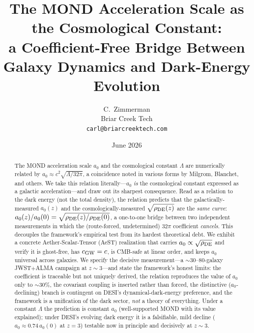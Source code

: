 \documentclass[11pt]{article}
\title{\bf The MOND Acceleration Scale as the Cosmological Constant:\\
a Coefficient-Free Bridge Between Galaxy Dynamics and Dark-Energy Evolution}
\author{C.\ Zimmerman\\ \small Briar Creek Tech\\ \small\texttt{carl@briarcreektech.com}}
\date{June 2026}
\newcommand{\az}{a_0}
\newcommand{\rde}{\rho_{\rm DE}}
\begin{document}
\maketitle

\begin{abstract}
\noindent
The MOND acceleration scale $\az$ and the cosmological constant $\Lambda$ are numerically related by
$\az \approx c^2\sqrt{\Lambda/32\pi}$, a coincidence noted in various forms by Milgrom, Blanchet, and others. We
take this relation literally---$\az$ \emph{is} the cosmological constant expressed as a galactic acceleration---and
draw out its sharpest consequence. Read as a relation to the dark energy (not the total density), the relation
predicts that the galactically-measured $\az(z)$ and the cosmologically-measured $\sqrt{\rde(z)}$ are the
\emph{same curve}: $\az(z)/\az(0)=\sqrt{\rde(z)/\rde(0)}$, a one-to-one bridge between two independent measurements
in which the (route-forced, undetermined) $32\pi$ coefficient \emph{cancels}. This decouples the framework's
empirical test from its hardest theoretical debt. We exhibit a concrete Aether-Scalar-Tensor (AeST) realization that
carries $\az\propto\sqrt{\rde}$ and verify it is ghost-free, has $c_{\rm GW}=c$, is CMB-safe at linear order, and
keeps $\az$ universal across galaxies. We specify the decisive measurement---a $\sim$30--80-galaxy JWST$+$ALMA
campaign at $z\sim3$---and state the framework's honest limits: the coefficient is traceable but not uniquely
derived, the relation reproduces the value of $\az$ only to $\sim$30\%, the covariant coupling is inserted rather
than forced, the distinctive ($\az$-declining) branch is contingent on DESI's dynamical-dark-energy preference, and
the framework is a unification of the dark sector, \emph{not} a theory of everything. Under a constant $\Lambda$ the
prediction is constant $\az$ (well-supported MOND with its value explained); under DESI's evolving dark energy it is
a falsifiable, mild decline ($\az\!\approx\!0.74\,\az(0)$ at $z=3$) testable now in principle and decisively at
$z\sim3$.
\end{abstract}
\end{document}
